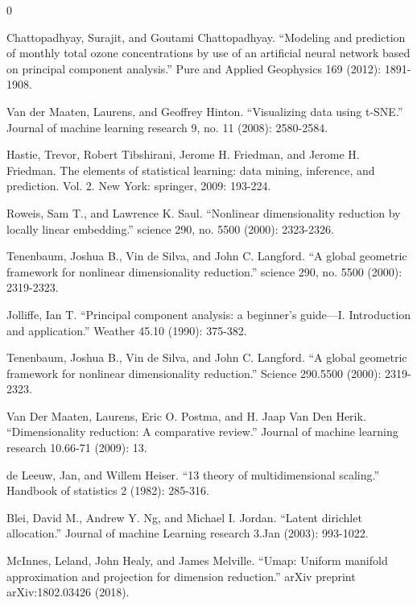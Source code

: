 \documentclass[a4paper,12pt]{extarticle}
\begin{document}
\begin{thebibliography}{0}

    \hypertarget{2}{}
 Chattopadhyay, Surajit, and Goutami Chattopadhyay. ``Modeling and prediction of monthly total ozone concentrations by use of an artificial neural network based on principal component analysis.'' Pure and Applied Geophysics 169 (2012): 1891-1908.

 	\hypertarget{2}{}
 Van der Maaten, Laurens, and Geoffrey Hinton. ``Visualizing data using t-SNE.'' Journal of machine learning research 9, no. 11 (2008): 2580-2584.

 	\hypertarget{2}{}
 Hastie, Trevor, Robert Tibshirani, Jerome H. Friedman, and Jerome H. Friedman. The elements of statistical learning: data mining, inference, and prediction. Vol. 2. New York: springer, 2009: 193-224.

 	\hypertarget{2}{}
 Roweis, Sam T., and Lawrence K. Saul. ``Nonlinear dimensionality reduction by locally linear embedding.'' science 290, no. 5500 (2000): 2323-2326.

 	\hypertarget{2}{}
 Tenenbaum, Joshua B., Vin de Silva, and John C. Langford. ``A global geometric framework for nonlinear dimensionality reduction.'' science 290, no. 5500 (2000): 2319-2323.

 	\hypertarget{2}{}
 Jolliffe, Ian T. ``Principal component analysis: a beginner's guide—I. Introduction and application.'' Weather 45.10 (1990): 375-382.

 	\hypertarget{2}{}
 Tenenbaum, Joshua B., Vin de Silva, and John C. Langford. ``A global geometric framework for nonlinear dimensionality reduction.'' Science 290.5500 (2000): 2319-2323.

 	\hypertarget{2}{}
 Van Der Maaten, Laurens, Eric O. Postma, and H. Jaap Van Den Herik. ``Dimensionality reduction: A comparative review.'' Journal of machine learning research 10.66-71 (2009): 13.

 \hypertarget{2}{}
 de Leeuw, Jan, and Willem Heiser. ``13 theory of multidimensional scaling.'' Handbook of statistics 2 (1982): 285-316.

 \hypertarget{2}{}
 Blei, David M., Andrew Y. Ng, and Michael I. Jordan. ``Latent dirichlet allocation.'' Journal of machine Learning research 3.Jan (2003): 993-1022.

 \hypertarget{2}{}
 McInnes, Leland, John Healy, and James Melville. ``Umap: Uniform manifold approximation and projection for dimension reduction.'' arXiv preprint arXiv:1802.03426 (2018).


\end{thebibliography}
\end{document}
